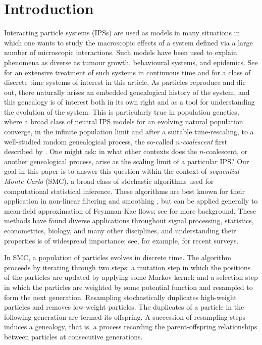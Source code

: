 \documentclass{article} %
\theoremstyle{definition}
\newcommand{\1}[1]{\mathbbm{1}_{\{#1\}}}
\begin{document}


\section{Introduction}
Interacting particle systems (IPSs) are used as models in many situations in which one wants to study the macroscopic effects of a system defined via a large number of microscopic interactions. Such models have been used to explain phenomena as diverse as tumour growth, behavioural systems, and epidemics. See \cite{lig:2005} for an extensive treatment of such systems in continuous time and \cite{delmoral2004} for a class of discrete time systems of interest in this article.
As particles reproduce and die out, there naturally arises an embedded genealogical history of the system, and this genealogy is of interest both in its own right and as a tool for understanding the evolution of the system. This is particularly true in population genetics, where a broad class of neutral IPS models for an evolving natural population converge, in the infinite population limit and after a suitable time-rescaling, to a well-studied random genealogical process, the so-called \emph{$n$-coalescent} first described by \cite{kingman1982coal}. One might ask: in what other contexts does the $n$-coalescent, or another genealogical process, arise as the scaling limit of a particular IPS? Our goal in this paper is to answer this question within the context of \emph{sequential Monte Carlo} (SMC), a broad class of stochastic algorithms used for computational statistical inference. These algorithms are best known for their application in non-linear filtering and smoothing \cite{gordon1993}, but can be applied generally to mean-field approximation of Feynman-Kac flows; see \cite{delmoral2004} for more background. These methods have found diverse applications throughout signal processing, statistics, econometrics, biology, and many other disciplines, and understanding their properties is of widespread importance; see, for example, \cite{chopin2020,doucet2009,fearnhead18,naesseth2019} for recent surveys.

In SMC, a population of particles evolves in discrete time. The algorithm proceeds by iterating through two steps: a mutation step in which the positions of the particles are updated by applying some Markov kernel; and a selection step in which the particles are weighted by some potential function and resampled to form the next generation. Resampling stochastically duplicates high-weight particles and removes low-weight particles. The duplicates of a particle in the following generation are termed its offspring. A succession of resampling steps induces a genealogy, that is, a process recording the parent-offspring relationships between particles at consecutive generations.
\end{document}
